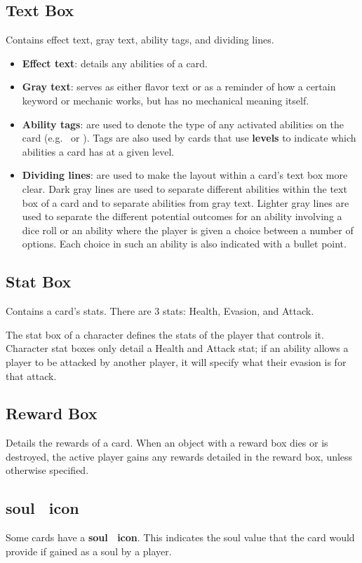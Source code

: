 \documentclass[
  fontsize=10pt,
  paper=a5,
  version=last,
  chapterprefix=true,
  bindingoffset=5mm,
  ]{scrbook}
\newcommand*{\inlineicon}[1]{%
    \raisebox{-.3\baselineskip}{%
        \smash{%
            \texttt{[image: \#1]}%
        }%
    }%
}
\newcommand{\tap}{\inlineicon{./assets/ms-tap.png}}
\newcommand{\pay}{\inlineicon{./assets/ms-paid.png}}
\newcommand{\soul}{\inlineicon{./assets/ms-soul.png}}
\begin{document}
    \subsection*{Text Box} Contains effect text, gray text, ability tags, and dividing lines.
    \begin{itemize}
        \item \textbf{Effect text}: details any abilities of a card.
        \item \textbf{Gray text}: serves as either flavor text or as a reminder of how a certain keyword or mechanic works, but has no mechanical meaning itself.
        \item \textbf{Ability tags}: are used to denote the type of any activated abilities on the card (e.g. \tap\ or \pay). Tags are also used by cards that use \textbf{levels} to indicate which abilities a card has at a given level.
        \item \textbf{Dividing lines}: are used to make the layout within a card’s text box more clear. Dark gray lines are used to separate different abilities within the text box of a card and to separate abilities from gray text. Lighter gray lines are used to separate the different potential outcomes for an ability involving a dice roll or an ability where the player is given a choice between a number of options. Each choice in such an ability is also indicated with a bullet point.
    \end{itemize}
    \subsection*{Stat Box}
    Contains a card’s stats. There are 3 stats: Health, Evasion, and Attack.

    The stat box of a character defines the stats of the player that controls it. Character stat boxes only detail a Health and Attack stat; if an ability allows a player to be attacked by another player, it will specify what their evasion is for that attack.
    \subsection*{Reward Box}
    Details the rewards of a card. When an object with a reward box dies or is destroyed, the active player gains any rewards detailed in the reward box, unless otherwise specified.
    \subsection*{soul\soul\ icon}
    Some cards have a \textbf{soul\soul\ icon}. This indicates the soul value that the card would provide if gained as a soul by a player.
\end{document}
